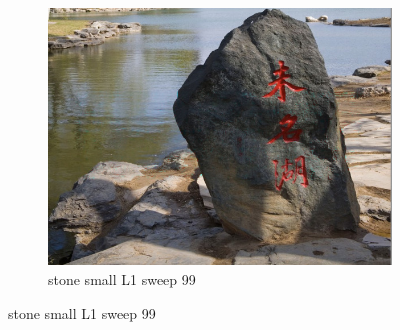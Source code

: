 \documentclass[11pt]{article}
\begin{document}
\begin{figure}[ht!]
\begin{subfigure}[]{0.333\linewidth}
        \centering
        \includegraphics[width=\linewidth]{fig/restoration/stone_small/L1/gibbs_99.jpg}
        \caption{stone small L1 sweep 99}
    \end{subfigure}%
\end{figure}
\end{document}
